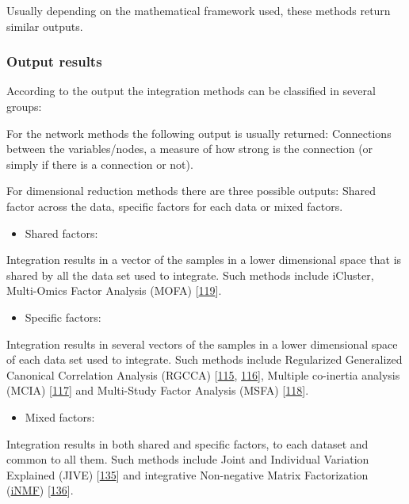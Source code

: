 \documentclass[
  12pt,
  a4paper,
  twoside,
  openright]{book}
\providecommand{\tightlist}{%
  \setlength{\itemsep}{0pt}\setlength{\parskip}{0pt}}
\begin{document}
Usually depending on the mathematical framework used, these methods return similar outputs.

\hypertarget{output-results}{%
\subsubsection{Output results}\label{output-results}}

According to the output the integration methods can be classified in several groups:

For the network methods the following output is usually returned: Connections between the variables/nodes, a measure of how strong is the connection (or simply if there is a connection or not).

For dimensional reduction methods there are three possible outputs: Shared factor across the data, specific factors for each data or mixed factors.

\begin{itemize}
\tightlist
\item
  Shared factors:
\end{itemize}

Integration results in a vector of the samples in a lower dimensional space that is shared by all the data set used to integrate.
Such methods include iCluster, Multi-Omics Factor Analysis (MOFA) {[}\protect\hyperlink{ref-argelaguet_multi-omics_2018}{119}{]}.

\begin{itemize}
\tightlist
\item
  Specific factors:
\end{itemize}

Integration results in several vectors of the samples in a lower dimensional space of each data set used to integrate.
Such methods include Regularized Generalized Canonical Correlation Analysis (RGCCA) {[}\protect\hyperlink{ref-tenenhaus_regularized_2011}{115}, \protect\hyperlink{ref-tenenhaus_variable_2014}{116}{]}, Multiple co-inertia analysis (MCIA) {[}\protect\hyperlink{ref-culhane_cross-platform_2003}{117}{]} and Multi-Study Factor Analysis (MSFA) {[}\protect\hyperlink{ref-vito_multi-study_2019}{118}{]}.

\begin{itemize}
\tightlist
\item
  Mixed factors:
\end{itemize}

Integration results in both shared and specific factors, to each dataset and common to all them.
Such methods include Joint and Individual Variation Explained (JIVE) {[}\protect\hyperlink{ref-lock2013a}{135}{]} and integrative Non-negative Matrix Factorization (\href{https://github.com/yangzi4/iNMF}{iNMF}) {[}\protect\hyperlink{ref-yang2016}{136}{]}.
\end{document}
